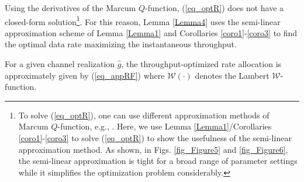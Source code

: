 Using the derivatives of the Marcum $Q$-function, (\ref{eq_optR}) does not have a closed-form solution\footnote{To solve (\ref{eq_optR}), one can use different approximation methods of Marcum $Q$-function, e.g., \cite{Guo2019WCLrate}. Here, we use Lemma \ref{Lemma1}/Corollaries \ref{coro1}-\ref{coro3} to solve (\ref{eq_optR}) to show the usefulness of the semi-linear approximation method. As shown, in Figs. \ref{fig_Figure5} and \ref{fig_Figure6}, the semi-linear approximation is tight for a broad range of parameter settings while it simplifies the optimization problem considerably. }. For this reason,  Lemma \ref{Lemma4}  uses the semi-linear approximation scheme of Lemma \ref{Lemma1} and Corollaries \ref{coro1}-\ref{coro3} to find the optimal data rate maximizing the instantaneous throughput.

\begin{lem}\label{Lemma4}
For a given channel realization $\hat{g}$, the throughput-optimized rate allocation is approximately given by (\ref{eq_appRF}) where $\mathcal{W}(\cdot)$ denotes the Lambert $\mathcal{W}$-function.
\end{lem}
